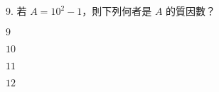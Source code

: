 \documentclass[12pt]{article}
\begin{document}
\begin{problem}
  \item[9.] 若 $A = 10^2 - 1$，則下列何者是 $A$ 的質因數？
  \begin{choices}
    \item $9$
    \item $10$
    \item $11$
    \item $12$
  \end{choices}
\end{problem}
\end{document}
